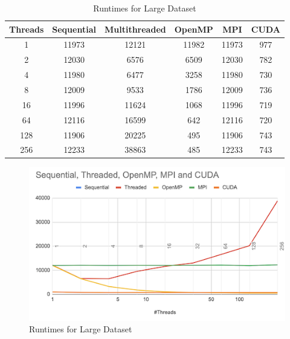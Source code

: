 \documentclass[conference]{IEEEtran}
\begin{document}
\begin{table}
    \begin{tabular}{||c | c | c | c | c | c||} 
     \hline
     Threads & Sequential & Multithreaded & OpenMP & MPI & CUDA \\ [0.2ex] 
     \hline\hline
    1 & 11973 & 12121 & 11982 & 11973 & 977 \\ [.1ex] 
     \hline
    2 & 12030 & 6576 & 6509 & 12030 & 782 \\ [.1ex] 
     \hline
    4 & 11980 & 6477 & 3258 & 11980 & 730 \\ [.1ex] 
     \hline
    8 & 12009 & 9533 & 1786 & 12009 & 736 \\ [.1ex] 
     \hline
    16 & 11996 & 11624 & 1068 & 11996 & 719 \\ [.1ex] 
     \hline
    64 & 12116 & 16599 & 642 & 12116 & 720 \\ [.1ex] 
     \hline
    128 & 11906 & 20225 & 495 & 11906 & 743 \\ [.1ex] 
     \hline
    256 & 12233 & 38863 & 485 & 12233 & 743 \\ [.1ex] 
     \hline
    \end{tabular}
\caption{\label{tab:Table5}Runtimes for Large Dataset}
\end{table}

\begin{figure}[htbp]
    \centerline{\includegraphics{report/rt_large_set.png}}
    \caption{Runtimes for Large Dataset}
    \label{fig5}
\end{figure}
\end{document}
